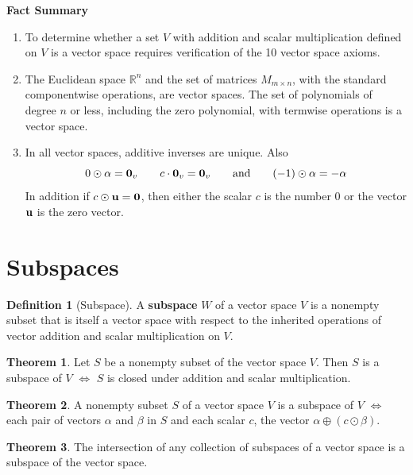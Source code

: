 \documentclass{article}
\theoremstyle{definition}
\newtheorem{theorem}{Theorem}
\newtheorem{definition}{Definition}
\newenvironment{factsummary}{
	{\large\textbf{Fact Summary}}\\
	}{
}
\newcommand{\reals}{\mathbb{R}}
\begin{document}
	\begin{factsummary}
		\begin{enumerate}[font=\bfseries,itemsep=0pt]
			\item To determine whether a set $V$ with addition and scalar multiplication defined on $V$ is a vector space requires verification of the 10 vector space axioms.
			\item The Euclidean space $\reals^n$ and the set of matrices $M_{m\times n}$, with the standard componentwise operations, are vector spaces. The set of polynomials of degree $n$ or less, including the zero polynomial, with termwise operations is a vector space.
			\item In all vector spaces, additive inverses are unique. Also
			\[ 0 \odot \alpha = \vb{0}_v \qquad c \cdot \vb{0}_v = \vb{0}_v \qquad \text{and} \qquad (-1)\odot \alpha = -\alpha \]
			In addition if $c \odot \vb{u} = \vb{0}$, then either the scalar $c$ is the number 0 or the vector $\vb{u}$ is the zero vector.
		\end{enumerate}
	\end{factsummary}
\section{Subspaces}
	\begin{definition}[Subspace]
			A \textbf{subspace} $W$ of a vector space $V$ is a nonempty subset that is itself a vector space with respect to the inherited operations of vector addition and scalar multiplication on $V$.
	\end{definition}
	\begin{theorem}
		Let $S$ be a nonempty subset of the vector space $V$. Then $S$ is a subspace of $V$ $\iff$ $S$ is closed under addition and scalar multiplication.
	\end{theorem}
	\begin{theorem}
		A nonempty subset $S$ of a vector space $V$ is a subspace of $V$ $\iff$ each pair of vectors $\alpha$ and $\beta$ in $S$ and each scalar $c$, the vector $\alpha \oplus (c \odot \beta)$.
	\end{theorem}
	\begin{theorem}
		The intersection of any collection of subspaces of a vector space is a subspace of the vector space.
	\end{theorem}
\end{document}

